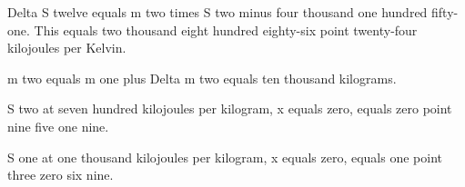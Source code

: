 Delta S twelve equals m two times S two minus four thousand one hundred fifty-one. This equals two thousand eight hundred eighty-six point twenty-four kilojoules per Kelvin.

m two equals m one plus Delta m two equals ten thousand kilograms.

S two at seven hundred kilojoules per kilogram, x equals zero, equals zero point nine five one nine.

S one at one thousand kilojoules per kilogram, x equals zero, equals one point three zero six nine.